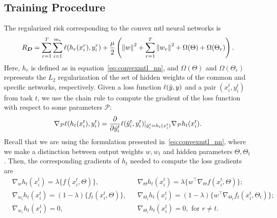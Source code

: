 \subsection{Training Procedure}
The regularized risk corresponding to the convex \acrshort{mtl} neural networks is
\begin{equation}
    \nonumber
    \begin{aligned}
        R_{\bm{D}} = \sum_{r=1}^T \sum_{i=1}^{m_r} \ell(h_r(x_i^r), y_i^r) + \frac{\mu}{2} \left( \left\lVert w\right\rVert^2 + \sum_{r=1}^T \left\lVert w_r\right\rVert^2 + \Omega(\Theta) + \Omega(\Theta_r)\right) .
    \end{aligned}
\end{equation}
Here, $h_r$ is defined as in equation~\eqref{eq:convexmtl_nn}, and $\Omega(\Theta)$ and $\Omega(\Theta_r)$ represents the $L_2$ regularization of the set of hidden weights of the common and specific networks, respectively.
Given a loss function $\ell(\hat{y}, y)$ and a pair $(x_i^t, y_i^t)$ from task $t$, we use the chain rule to compute the gradient of the loss function with respect to some parameters $\mathcal{P}$:
\begin{equation}
    \nonumber
    \nabla_\mathcal{P} \ell(h_t(x_i^t), y_i^t) = 
    \frac{\partial}{\partial \hat{y}_i^t} \ell(\hat{y}_i^t, y_i^t) \vert_{\hat{y}_i^t = h_t(x_i^t)} \nabla_\mathcal{P} h_t(x_i^t) .
\end{equation}
Recall that we are using the formulation presented in~\eqref{eq:convexmtl_nn},
where we make a distinction between output weights $w, w_t$ and hidden parameters $\Theta, \Theta_t$.
Then, the corresponding gradients of $h_t$ needed to compute the loss gradients are
\begin{equation}\label{eq:gradients_losses} 
    \begin{aligned}       
        &\nabla_{w} h_t(x_i^t)  
        = \lambda \lbrace f(x_i^t, \Theta) \rbrace ,
        &&\nabla_{\Theta} h_t(x_i^t)  
        = \lambda \lbrace w^\intercal \nabla_\Theta f(x_i^t, \Theta)\rbrace ; \\
        &\nabla_{w_t} h_t(x_i^t)  
        = (1 - \lambda) \lbrace f_t(x_i^t, \Theta) \rbrace ,
        &&\nabla_{\Theta_t} h_t(x_i^t)  
        = (1 - \lambda) \lbrace  w^\intercal \nabla_{\Theta_t} f_t(x_i^t, \Theta_t)\rbrace ; \\
        &\nabla_{w_r} h_t(x_i^t)  
        =  0 , 
        &&\nabla_{\Theta_r} h_t(x_i^t)  
        =  0 , \text{ for } r \neq t .\\
    \end{aligned}    
\end{equation}
